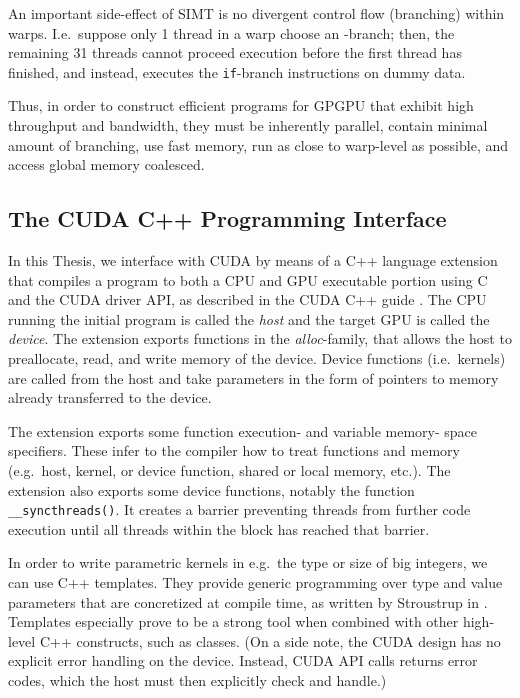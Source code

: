   An important side-effect of SIMT is no divergent control flow (branching)
  within warps. I.e.\ suppose only 1 thread in a warp choose an -branch;
  then, the remaining 31 threads cannot proceed execution before the first
  thread has finished, and instead, executes the \texttt{if}-branch instructions
  on dummy data.

  Thus, in order to construct efficient programs for GPGPU that exhibit high
  throughput and bandwidth, they must be inherently parallel, contain minimal
  amount of branching, use fast memory, run as close to warp-level as possible,
  and access global memory coalesced.

\subsection{The CUDA C++ Programming Interface}
\label{subsec:cuda}

In this Thesis, we interface with CUDA by means of a C++ language extension that
compiles a program to both a CPU and GPU executable portion using C and the CUDA
driver API, as described in the CUDA C++ guide \cite{cudaguide}. The CPU running
the initial program is called the \textit{host} and the target GPU is called the
\textit{device}. The extension exports functions in the \textit{alloc}-family,
that allows the host to preallocate, read, and write memory of the
device. Device functions (i.e.\ kernels) are called from the host and take
parameters in the form of pointers to memory already transferred to the device.

The extension exports some function execution- and variable memory- space
specifiers. These infer to the compiler how to treat functions and memory (e.g.\
host, kernel, or device function, shared or local memory, etc.). The extension
also exports some device functions, notably the function
\texttt{\_\_syncthreads()}. It creates a barrier preventing threads from further
code execution until all threads within the block has reached that barrier.

In order to write parametric kernels in e.g.\ the type or size of big integers,
we can use C++ templates. They provide generic programming over type and value
parameters that are concretized at compile time, as written by Stroustrup in
\cite{stroustrup}. Templates especially prove to be a strong tool when combined
with other high-level C++ constructs, such as classes.  (On a side note, the
CUDA design has no explicit error handling on the device. Instead, CUDA API
calls returns error codes, which the host must then explicitly check and
handle.)


